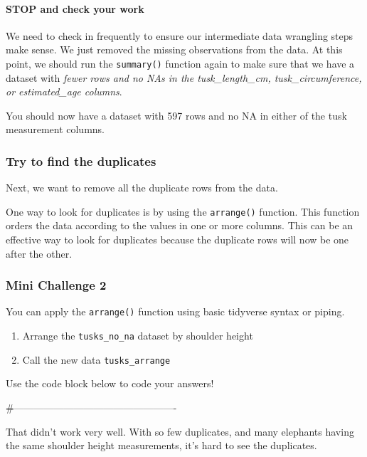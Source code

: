 \documentclass[
]{article}
\providecommand{\tightlist}{%
  \setlength{\itemsep}{0pt}\setlength{\parskip}{0pt}}
\begin{document}
\paragraph{\texorpdfstring{\textbf{STOP and check your
work}}{STOP and check your work}}\label{stop-and-check-your-work}

We need to check in frequently to ensure our intermediate data wrangling
steps make sense. We just removed the missing observations from the
data. At this point, we should run the \texttt{summary()} function again
to make sure that we have a dataset with \emph{fewer rows and no NAs in
the tusk\_length\_cm, tusk\_circumference, or estimated\_age columns}.

You should now have a dataset with 597 rows and no NA in either of the
tusk measurement columns.

\subsubsection{Try to find the
duplicates}\label{try-to-find-the-duplicates}

Next, we want to remove all the duplicate rows from the data.

One way to look for duplicates is by using the \texttt{arrange()}
function. This function orders the data according to the values in one
or more columns. This can be an effective way to look for duplicates
because the duplicate rows will now be one after the other.

\subsubsection{\texorpdfstring{\textbf{Mini Challenge
2}}{Mini Challenge 2}}\label{mini-challenge-2}

You can apply the \texttt{arrange()} function using basic tidyverse
syntax or piping.

\begin{enumerate}
\def\labelenumi{\arabic{enumi}.}
\tightlist
\item
  Arrange the \texttt{tusks\_no\_na} dataset by shoulder height
\item
  Call the new data \texttt{tusks\_arrange}
\end{enumerate}

Use the code block below to code your answers!

\#-------------------------------------------------

That didn't work very well. With so few duplicates, and many elephants
having the same shoulder height measurements, it's hard to see the
duplicates.
\end{document}
